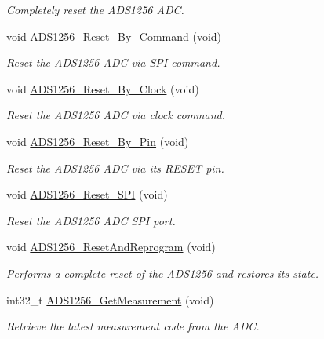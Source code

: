 \begin{DoxyCompactItemize}
\begin{DoxyCompactList}\small\item\em Completely reset the A\-D\-S1256 A\-D\-C. \end{DoxyCompactList}\item 
void \hyperlink{group__ads1256__driver_gafdd4555dcde566f72adf2d9d51f4a883}{A\-D\-S1256\-\_\-\-Reset\-\_\-\-By\-\_\-\-Command} (void)
\begin{DoxyCompactList}\small\item\em Reset the A\-D\-S1256 A\-D\-C via S\-P\-I command. \end{DoxyCompactList}\item 
void \hyperlink{group__ads1256__driver_ga1c25b603705f67cccde59e406b1c4c07}{A\-D\-S1256\-\_\-\-Reset\-\_\-\-By\-\_\-\-Clock} (void)
\begin{DoxyCompactList}\small\item\em Reset the A\-D\-S1256 A\-D\-C via clock command. \end{DoxyCompactList}\item 
void \hyperlink{group__ads1256__driver_ga4664ba6707817673019016b0b0d6668e}{A\-D\-S1256\-\_\-\-Reset\-\_\-\-By\-\_\-\-Pin} (void)
\begin{DoxyCompactList}\small\item\em Reset the A\-D\-S1256 A\-D\-C via its R\-E\-S\-E\-T pin. \end{DoxyCompactList}\item 
void \hyperlink{group__ads1256__driver_ga5fb186f2113df3c976ae00debb6095d7}{A\-D\-S1256\-\_\-\-Reset\-\_\-\-S\-P\-I} (void)
\begin{DoxyCompactList}\small\item\em Reset the A\-D\-S1256 A\-D\-C S\-P\-I port. \end{DoxyCompactList}\item 
void \hyperlink{group__ads1256__driver_ga16dbb214bb63f6051170ee4f8964beb6}{A\-D\-S1256\-\_\-\-Reset\-And\-Reprogram} (void)
\begin{DoxyCompactList}\small\item\em Performs a complete reset of the A\-D\-S1256 and restores its state. \end{DoxyCompactList}\item 
int32\-\_\-t \hyperlink{group__ads1256__driver_ga7dee6663af668f862c4bca7c56d80f5e}{A\-D\-S1256\-\_\-\-Get\-Measurement} (void)
\begin{DoxyCompactList}\small\item\em Retrieve the latest measurement code from the A\-D\-C. \end{DoxyCompactList}\item 

\end{DoxyCompactItemize}
